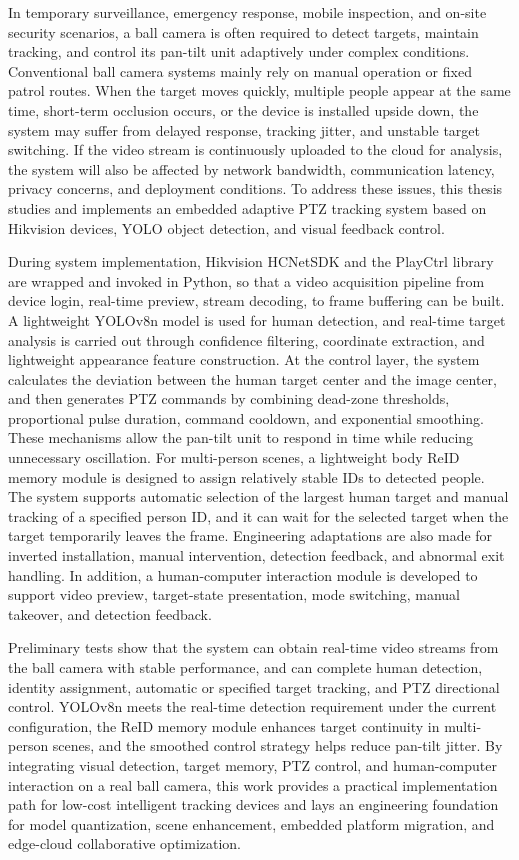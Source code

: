 \begin{eabstract}
In temporary surveillance, emergency response, mobile inspection, and on-site security scenarios, a ball camera is often required to detect targets, maintain tracking, and control its pan-tilt unit adaptively under complex conditions. Conventional ball camera systems mainly rely on manual operation or fixed patrol routes. When the target moves quickly, multiple people appear at the same time, short-term occlusion occurs, or the device is installed upside down, the system may suffer from delayed response, tracking jitter, and unstable target switching. If the video stream is continuously uploaded to the cloud for analysis, the system will also be affected by network bandwidth, communication latency, privacy concerns, and deployment conditions. To address these issues, this thesis studies and implements an embedded adaptive PTZ tracking system based on Hikvision devices, YOLO object detection, and visual feedback control.

During system implementation, Hikvision HCNetSDK and the PlayCtrl library are wrapped and invoked in Python, so that a video acquisition pipeline from device login, real-time preview, stream decoding, to frame buffering can be built. A lightweight YOLOv8n model is used for human detection, and real-time target analysis is carried out through confidence filtering, coordinate extraction, and lightweight appearance feature construction. At the control layer, the system calculates the deviation between the human target center and the image center, and then generates PTZ commands by combining dead-zone thresholds, proportional pulse duration, command cooldown, and exponential smoothing. These mechanisms allow the pan-tilt unit to respond in time while reducing unnecessary oscillation. For multi-person scenes, a lightweight body ReID memory module is designed to assign relatively stable IDs to detected people. The system supports automatic selection of the largest human target and manual tracking of a specified person ID, and it can wait for the selected target when the target temporarily leaves the frame. Engineering adaptations are also made for inverted installation, manual intervention, detection feedback, and abnormal exit handling. In addition, a human-computer interaction module is developed to support video preview, target-state presentation, mode switching, manual takeover, and detection feedback.

Preliminary tests show that the system can obtain real-time video streams from the ball camera with stable performance, and can complete human detection, identity assignment, automatic or specified target tracking, and PTZ directional control. YOLOv8n meets the real-time detection requirement under the current configuration, the ReID memory module enhances target continuity in multi-person scenes, and the smoothed control strategy helps reduce pan-tilt jitter. By integrating visual detection, target memory, PTZ control, and human-computer interaction on a real ball camera, this work provides a practical implementation path for low-cost intelligent tracking devices and lays an engineering foundation for model quantization, scene enhancement, embedded platform migration, and edge-cloud collaborative optimization.
\end{eabstract}
